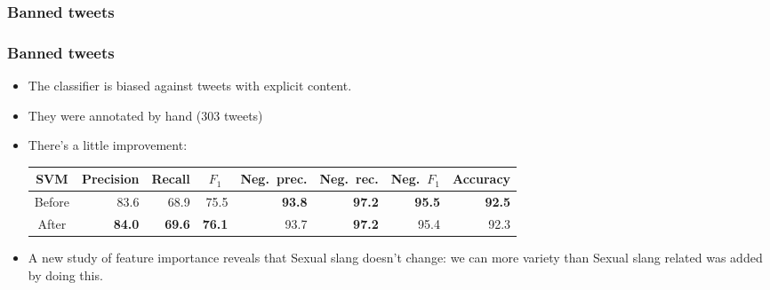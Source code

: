 \subsubsection{Banned tweets}
\begin{frame}
    \frametitle{Banned tweets}

    \begin{itemize}
        \item The classifier is biased against tweets with explicit content.
        \item They were annotated by hand (303 tweets)
        \item There's a little improvement:
        \begin{center}
            \scriptsize
            \begin{tabular}{ c r r r r r r r }
                \textbf{SVM} & \multicolumn{1}{c}{Precision} & \multicolumn{1}{c}{Recall} & \multicolumn{1}{c}{$F_1$} & \multicolumn{1}{c}{Neg.\ prec.} & \multicolumn{1}{c}{Neg.\ rec.} & \multicolumn{1}{c}{Neg.\ $F_1$} & \multicolumn{1}{c}{Accuracy} \\
                \midrule
                Before & 83.6 & 68.9 & 75.5 & \textbf{93.8} & \textbf{97.2} & \textbf{95.5} & \textbf{92.5} \\
                \midrule
                After & \textbf{84.0} & \textbf{69.6} & \textbf{76.1} & 93.7 & \textbf{97.2} & 95.4 & 92.3 \\
            \end{tabular}
        \end{center}
        \item A new study of feature importance reveals that Sexual slang doesn't change: we can more variety than Sexual slang related was added by doing this.
    \end{itemize}
\end{frame}

